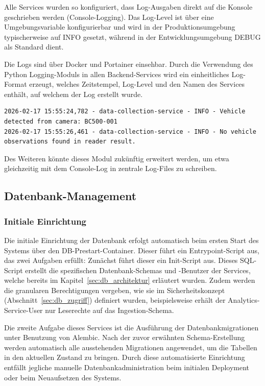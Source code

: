 Alle Services wurden so konfiguriert, dass Log-Ausgaben direkt auf die Konsole geschrieben werden (Console-Logging).
Das Log-Level ist über eine Umgebungsvariable konfigurierbar und wird in der Produktionsumgebung typischerweise auf INFO gesetzt, während in der Entwicklungsumgebung DEBUG als Standard dient.

Die Logs sind über Docker und Portainer einsehbar.
Durch die Verwendung des Python Logging-Moduls in allen Backend-Services wird ein einheitliches Log-Format erzeugt, welches Zeitstempel, Log-Level und den Namen des Services enthält, auf welchem der Log erstellt wurde.

\begin{lstlisting}[caption={Beispielhafte Log-Ausgabe des Data Collection Services}, label={lst:log_example}]
2026-02-17 15:55:24,782 - data-collection-service - INFO - Vehicle detected from camera: BC500-001
2026-02-17 15:55:26,461 - data-collection-service - INFO - No vehicle observations found in reader result.
\end{lstlisting}

Des Weiteren könnte dieses Modul zukünftig erweitert werden, um etwa gleichzeitig mit dem Console-Log in zentrale Log-Files zu schreiben.

\newpage
\subsection{Datenbank-Management}


\subsubsection{Initiale Einrichtung}

Die initiale Einrichtung der Datenbank erfolgt automatisch beim ersten Start des Systems über den DB-Prestart-Container.
Dieser führt ein Entrypoint-Script aus, das zwei Aufgaben erfüllt:
Zunächst führt dieser ein Init-Script aus. Dieses SQL-Script erstellt die spezifischen Datenbank-Schemas und -Benutzer der Services, welche bereits im Kapitel~\ref{sec:db_architektur} erläutert wurden.
Zudem werden die granularen Berechtigungen vergeben, wie sie im Sicherheitskonzept (Abschnitt~\ref{sec:db_zugriff}) definiert wurden, beispielsweise erhält der Analytics-Service-User nur Leserechte auf das Ingestion-Schema.

Die zweite Aufgabe dieses Services ist die Ausführung der Datenbankmigrationen unter Benutzung von Alembic.
Nach der zuvor erwähnten Schema-Erstellung werden automatisch alle ausstehenden Migrationen angewendet, um die Tabellen in den aktuellen Zustand zu bringen.
Durch diese automatisierte Einrichtung entfällt jegliche manuelle Datenbankadministration beim initialen Deployment oder beim Neuaufsetzen des Systems.

